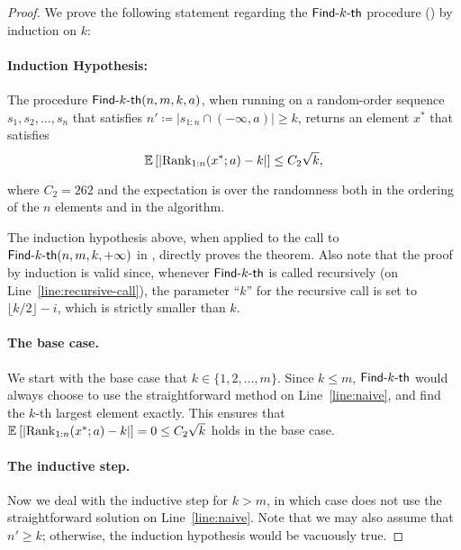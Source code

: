 \begin{proof}
We prove the following statement regarding the $\textsf{Find-}k\textsf{-th}$ procedure () by induction on $k$: 
\paragraph{Induction Hypothesis:} The procedure $\textsf{Find-}k\textsf{-th}(n, m, k, a)$, when running on a random-order sequence $s_1, s_2, \ldots, s_n$ that satisfies $n' \coloneqq |s_{1:n} \cap (-\infty, a)| \ge k$, returns an element $x^*$ that satisfies
\[
    \operatorname*{\mathbb{E}}_{}\left[\left|\mathrm{Rank}_{1:n}(x^*; a) - k\right|\right] \le C_2\sqrt{k},
\]
where $C_2 = 262$ and the expectation is over the randomness both in the ordering of the $n$ elements and in the algorithm.

The induction hypothesis above, when applied to the call to $\textsf{Find-}k\textsf{-th}(n, m, k, +\infty)$ in , directly proves the theorem. Also note that the proof by induction is valid since, whenever $\textsf{Find-}k\textsf{-th}$ is called recursively (on Line~\ref{line:recursive-call}), the parameter ``$k$'' for the recursive call is set to $\lfloor k/2 \rfloor - i$, which is strictly smaller than $k$.

\paragraph{The base case.} We start with the base case that $k \in \{1, 2, \ldots, m\}$. Since $k \le m$, $\textsf{Find-}k\textsf{-th}$ would always choose to use the straightforward method on Line~\ref{line:naive}, and find the $k$-th largest element exactly. This ensures that $\operatorname*{\mathbb{E}}_{}\left[|\mathrm{Rank}_{1:n}(x^*; a) - k|\right] = 0 \le C_2\sqrt{k}$ holds in the base case.


\paragraph{The inductive step.} Now we deal with the inductive step for $k > m$, in which case  does not use the straightforward solution on Line~\ref{line:naive}. Note that we may also assume that $n' \ge k$; otherwise, the induction hypothesis would be vacuously true.


\end{proof}
